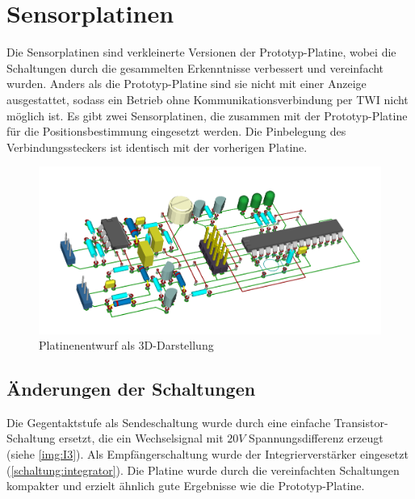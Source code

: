 \section{Sensorplatinen}
Die Sensorplatinen sind verkleinerte Versionen der Prototyp-Platine, wobei die Schaltungen durch die gesammelten Erkenntnisse verbessert und vereinfacht wurden. Anders als die Prototyp-Platine sind sie nicht mit einer Anzeige ausgestattet, sodass ein Betrieb ohne Kommunikationsverbindung per \ac{TWI} nicht möglich ist. Es gibt zwei Sensorplatinen, die zusammen mit der Prototyp-Platine für die Positionsbestimmung eingesetzt werden. Die Pinbelegung des Verbindungssteckers ist identisch mit der vorherigen Platine.

\begin{figure}[H]
	\centering
	\includegraphics[width=(\textwidth)]{images/endplatine_3d.png}
	\caption{Platinenentwurf als 3D-Darstellung} \label{img:endplatine3d}
\end{figure}


\subsection{Änderungen der Schaltungen}
Die Gegentaktstufe als Sendeschaltung wurde durch eine einfache Transistor-Schaltung ersetzt, die ein Wechselsignal mit $20V$ Spannungsdifferenz erzeugt (siehe \ref{img:I3}). Als Empfängerschaltung wurde der Integrierverstärker eingesetzt (\ref{schaltung:integrator}). Die Platine wurde durch die vereinfachten Schaltungen kompakter und erzielt ähnlich gute Ergebnisse wie die Prototyp-Platine.


